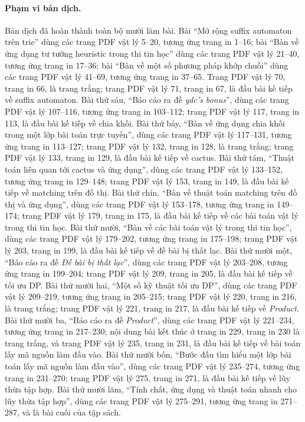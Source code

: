 \documentclass[11pt]{article}
\begin{document}
\paragraph{Phạm vi bản dịch.}
Bản dịch đã hoàn thành toàn bộ mười lăm bài. Bài ``Mở rộng suffix automaton
trên trie'' dùng các trang PDF vật
lý 5--20, tương ứng trang in 1--16; bài ``Bàn về ứng dụng tư tưởng heuristic
trong thi tin học'' dùng các trang PDF vật lý 21--40, tương ứng trang in
17--36; bài ``Bàn về một số phương pháp khớp chuỗi'' dùng các trang PDF vật lý
41--69, tương ứng trang in 37--65. Trang PDF vật lý 70, trang in 66, là trang
trắng; trang PDF vật lý 71, trang in 67, là đầu bài kế tiếp về suffix automaton.
Bài thứ sáu, ``Báo cáo ra đề \emph{ydc's bonus}'', dùng các trang PDF vật lý
107--116, tương ứng trang in 103--112; trang PDF vật lý 117, trang in 113, là
đầu bài kế tiếp về chia khối. Bài thứ bảy, ``Bàn về ứng dụng chia khối trong
một lớp bài toán trực tuyến'', dùng các trang PDF vật lý 117--131, tương ứng
trang in 113--127; trang PDF vật lý 132, trang in 128, là trang trắng; trang
PDF vật lý 133, trang in 129, là đầu bài kế tiếp về cactus. Bài thứ tám,
``Thuật toán liên quan tới cactus và ứng dụng'', dùng các trang PDF vật lý
133--152, tương ứng trang in 129--148; trang PDF vật lý 153, trang in 149, là
đầu bài kế tiếp về matching trên đồ thị. Bài thứ chín, ``Bàn về thuật toán
matching trên đồ thị và ứng dụng'', dùng các trang PDF vật lý 153--178, tương
ứng trang in 149--174; trang PDF vật lý 179, trang in 175, là đầu bài kế tiếp
về các bài toán vật lý trong thi tin học. Bài thứ mười, ``Bàn về các bài toán
vật lý trong thi tin học'', dùng các trang PDF vật lý 179--202, tương ứng trang
in 175--198; trang PDF vật lý 203, trang in 199, là đầu bài kế tiếp về đề bài
bị thất lạc. Bài thứ mười một, ``Báo cáo ra đề \emph{Đề bài bị thất lạc}'',
dùng các trang PDF vật lý 203--208, tương ứng trang in 199--204; trang PDF vật
lý 209, trang in 205, là đầu bài kế tiếp về tối ưu DP. Bài thứ mười hai, ``Một
số kỹ thuật tối ưu DP'', dùng các trang PDF vật lý 209--219, tương ứng trang in
205--215; trang PDF vật lý 220, trang in 216, là trang trắng; trang PDF vật lý
221, trang in 217, là đầu bài kế tiếp về \emph{Product}. Bài thứ mười ba, ``Báo
cáo ra đề \emph{Product}'', dùng các trang PDF vật lý 221--234, tương ứng trang
in 217--230; nội dung bài kết thúc ở trang in 229, trang in 230 là trang trắng,
và trang PDF vật lý 235, trang in 231, là đầu bài kế tiếp về bài toán lấy mã
nguồn làm đầu vào. Bài thứ mười bốn, ``Bước đầu tìm hiểu một lớp bài toán lấy mã
nguồn làm đầu vào'', dùng các trang PDF vật lý 235--274, tương ứng trang in
231--270; trang PDF vật lý 275, trang in 271, là đầu bài kế tiếp về lũy thừa tập
hợp. Bài thứ mười lăm, ``Tính chất, ứng dụng và thuật toán nhanh cho lũy thừa
tập hợp'', dùng các trang PDF vật lý 275--291, tương ứng trang in 271--287, và
là bài cuối của tập sách.
\end{document}
